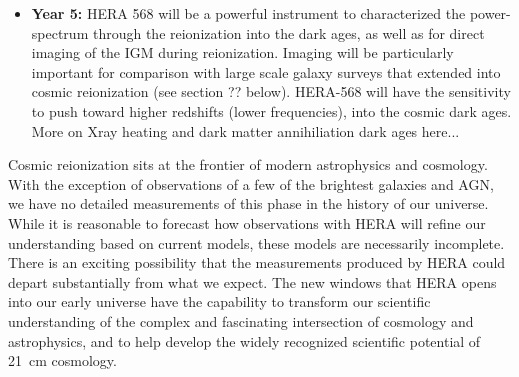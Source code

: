 \documentclass[preprint]{aastex}
\begin{document}
\begin{itemize}
\item {\bf Year 5:} HERA 568 will be a powerful instrument to characterized the power-spectrum through the reionization into the dark ages, as well as for direct imaging of the IGM during reionization. Imaging will be particularly important for comparison with large scale galaxy surveys that extended into cosmic reionization (see section ?? below). HERA-568 will have the sensitivity to push toward higher redshifts (lower frequencies), into the cosmic dark ages. More on Xray heating and dark matter annihiliation dark ages here...

\end{itemize}



Cosmic reionization sits at the frontier of modern astrophysics and cosmology. With the exception of observations of a few
of the brightest galaxies and AGN, we have no detailed measurements of this phase in the history of our universe.  
While it is reasonable to forecast how observations with HERA will refine our understanding based on current
models, these models are necessarily incomplete.  There is an exciting possibility that 
the measurements produced by HERA could depart substantially from what we expect.  The new
windows that HERA opens into our early universe have the capability to transform our scientific
understanding of the complex and fascinating intersection of cosmology and astrophysics, and to
help develop the widely recognized scientific potential of 21~cm cosmology.
\end{document}
